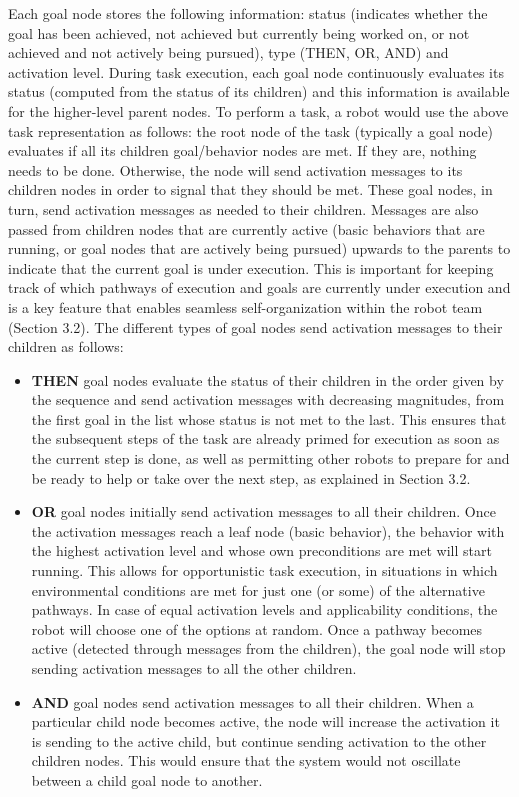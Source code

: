 \documentclass[letterpaper, 10 pt, conference]{ieeeconf}  %
\begin{document}
Each goal node stores the following information: status (indicates whether the goal has been achieved, not achieved but currently being worked on, or not achieved and not actively being pursued), type (THEN, OR, AND) and activation level. During task execution, each goal node continuously evaluates its status (computed from the status of its children) and this information is available for the higher-level parent nodes. To perform a task, a robot would use the above task representation as follows: the root node of the task (typically a goal node) evaluates if all its children goal/behavior nodes are met. If they are, nothing needs to be done. Otherwise, the node will send activation messages to its children nodes in order to signal that they should be met. These goal nodes, in turn, send activation messages as needed to their children. Messages are also passed from children nodes that are currently active (basic behaviors that are running, or goal nodes that are actively being pursued) upwards to the parents to indicate that the current goal is under execution. This is important for keeping track of which pathways of execution and goals are currently under execution and is a key feature that enables seamless self-organization within the robot team (Section 3.2). The different types of goal nodes send activation messages to their children as follows:

\begin{itemize}

\item {\bf THEN} goal nodes evaluate the status of their children in the order given by the sequence and send activation messages with decreasing magnitudes, from the first goal in the list whose status is not met to the last. This ensures that the subsequent steps of the task are already primed for execution as soon as the current step is done, as well as permitting other robots to prepare for and be ready to help or take over the next step, as explained in Section 3.2.  

\item {\bf OR} goal nodes initially send activation messages to all their children. Once the activation messages reach a leaf node (basic behavior), the behavior with the highest activation level and whose own preconditions are met will start running. This allows for opportunistic task execution, in situations in which environmental conditions are met for just one (or some) of the alternative pathways. In case of equal activation levels and applicability conditions, the robot will choose one of the options at random. Once a pathway becomes active (detected through messages from the children), the goal node will stop sending activation messages to all the other children.

\item {\bf AND} goal nodes send activation messages to all their children. When a particular child node becomes active, the node will increase the activation it is sending to the active child, but continue sending activation to the other children nodes. This would ensure that the system would not oscillate between a child goal node to another.
\end{itemize}
\end{document}
